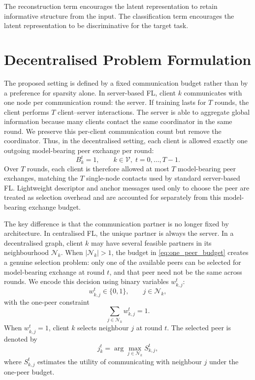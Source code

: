 \documentclass[conference]{IEEEtran}
\newcommand{\rev}[1]{#1}
\begin{document}
The reconstruction term encourages the latent representation to retain informative structure from the input. The classification term encourages the latent representation to be discriminative for the target task.

\section{Decentralised Problem Formulation}
\label{sec:decentralised-problem-formulation}

The proposed setting is defined by a fixed communication budget rather than by a preference for sparsity alone. In server-based FL, client $k$ communicates with one node per communication round: the server. If training lasts for $T$ rounds, the client performs $T$ client--server interactions. The server is able to aggregate global information because many clients contact the same coordinator in the same round. We preserve this per-client communication count but remove the coordinator. Thus, in the decentralised setting, each client is allowed exactly one outgoing \rev{model-bearing} peer \rev{exchange} per round:
\begin{equation}
    B_k^t = 1,
    \qquad k\in\mathcal{V},\; t=0,\dots,T-1.
    \label{eq:one_peer_budget}
\end{equation}
Over $T$ rounds, each client is therefore allowed at most $T$ \rev{model-bearing} peer exchanges, matching the $T$ single-node contacts used by standard server-based FL. \rev{Lightweight descriptor and anchor messages used only to choose the peer are treated as selection overhead and are accounted for separately from this model-bearing exchange budget.}

The key difference is that the communication partner is no longer fixed by architecture. In centralised FL, the unique partner is always the server. In a decentralised graph, client $k$ may have several feasible partners in its neighbourhood $\mathcal{N}_k$. When $|\mathcal{N}_k|>1$, the budget in \eqref{eq:one_peer_budget} creates a genuine selection problem: only one of the available peers can be \rev{selected for model-bearing exchange} at round $t$, and that peer need not be the same across rounds. We encode this decision using binary variables $w_{k,j}^t$:
\begin{equation}
    w_{k,j}^{t}\in\{0,1\},
    \qquad j\in\mathcal{N}_k,
    \label{eq:binary_peer_indicator}
\end{equation}
with the one-peer constraint
\begin{equation}
    \sum_{j\in\mathcal{N}_k} w_{k,j}^{t}=1.
    \label{eq:one_peer_constraint}
\end{equation}
When $w_{k,j}^t=1$, client $k$ selects neighbour $j$ at round $t$. The selected peer is denoted by
\begin{equation*}
    j_k^t = \arg\max_{j\in\mathcal{N}_k} S_{k,j}^{t},
\end{equation*}
where $S_{k,j}^{t}$ estimates the utility of communicating with neighbour $j$ under the one-peer budget.
\end{document}
